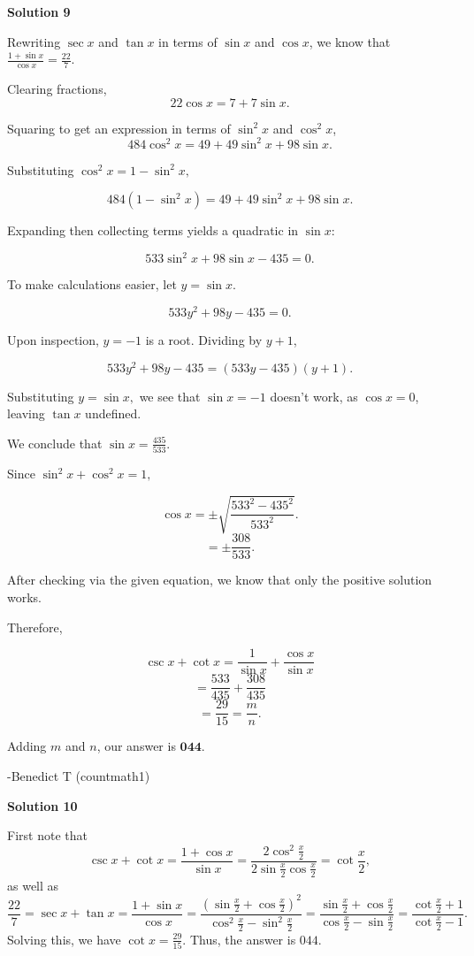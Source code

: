 \begin{enumerate}
\textbf{Solution 9}

Rewriting $\sec{x}$ and $\tan{x}$ in terms of $\sin{x}$ and $\cos{x}$, we know that $\frac{1+\sin{x}}{\cos{x}}=\frac{22}{7}.$

 Clearing fractions, 
 \[22\cos{x}=7+7\sin{x}.\]

 Squaring to get an expression in terms of $\sin^2{x}$ and $\cos^2{x}$, 
 \[484\cos^2{x}=49+49\sin^2{x}+98\sin{x}.\]

 Substituting $\cos^2{x}=1-\sin^2{x},$

 \[484(1-\sin^2{x})=49+49\sin^2{x}+98\sin{x}.\]

 Expanding then collecting terms yields a quadratic in $\sin{x}:$

 \[533\sin^2{x}+98\sin{x}-435=0.\]

 To make calculations easier, let $y=\sin{x}.$

 \[533y^2+98y-435=0.\]

 Upon inspection, $y=-1$ is a root. Dividing by $y+1$, 

 
 \[533y^2+98y-435=(533y-435)(y+1).\]

 Substituting $y=\sin{x},$ we see that $\sin{x}=-1$ doesn't work, as $\cos{x}=0$, leaving $\tan{x}$ undefined. 

 We conclude that $\sin{x}=\frac{435}{533}.$

 Since $\sin^2{x}+\cos^2{x}=1,$

 \[\cos{x}=\pm \sqrt{\frac{533^2-435^2}{533^2}}.\]
 \[=\pm \frac{308}{533}.\]

 After checking via the given equation, we know that only the positive solution works. 

 Therefore,

 
 \[\csc{x}+\cot{x}=\frac{1}{\sin{x}}+\frac{\cos{x}}{\sin{x}}\]
 \[=\frac{533}{435}+\frac{308}{435}\]
 \[=\frac{29}{15}=\frac{m}{n}.\]

 Adding $m$ and $n$, our answer is $\boxed{\textbf{044}}.$

 -Benedict T (countmath1)

 



\textbf{Solution 10}

First note that
 \[\csc{x} + \cot{x} = \frac{1+\cos{x}}{\sin{x}}=\frac{2\cos^2{\frac{x}{2}}}{2\sin{\frac{x}{2}}\cos{\frac{x}{2}}}=\cot{\frac{x}{2}},\]as well as
 \[\frac{22}{7}=\sec{x} + \tan{x} = \frac{1+\sin{x}}{\cos{x}} = \frac{(\sin{\frac{x}{2}} + \cos{\frac{x}{2}})^2}{\cos^2{\frac{x}{2}} - \sin^2{\frac{x}{2}}}=\frac{\sin{\frac{x}{2}} + \cos{\frac{x}{2}}}{\cos{\frac{x}{2}} -\sin{\frac{x}{2}}} = \frac{\cot{\frac{x}{2}}+1}{\cot{\frac{x}{2}}-1}.\]Solving this, we have $\cot{x}=\frac{29}{15}.$ Thus, the answer is $\boxed{044}.$




\end{enumerate}
